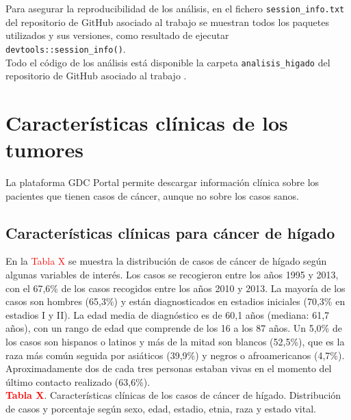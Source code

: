 Para asegurar la reproducibilidad de los análisis, en el fichero \texttt{session\_info.txt} del repositorio de GitHub asociado al trabajo \cite{Redondo-Sanchez2020} se muestran todos los paquetes utilizados y sus versiones, como resultado de ejecutar \texttt{devtools::session\_info()}.\\

Todo el código de los análisis está disponible la carpeta \texttt{analisis\_higado} del repositorio de GitHub asociado al trabajo \cite{Redondo-Sanchez2020}.

\section{Características clínicas de los tumores}
 
La plataforma GDC Portal \cite{GDCPortal} permite descargar información clínica sobre los pacientes que tienen casos de cáncer, aunque no sobre los casos sanos.

\subsection{Características clínicas para cáncer de hígado}

En la \textcolor{red}{Tabla X} se muestra  la distribución de casos de cáncer de hígado según algunas variables de interés. Los casos se recogieron entre los años 1995 y 2013, con el 67,6\% de los casos recogidos entre los años 2010 y 2013. La mayoría de los casos son hombres (65,3\%) y están diagnosticados en estadios iniciales (70,3\% en estadios I y II). La edad media de diagnóstico es de 60,1 años (mediana: 61,7 años), con un rango de edad que comprende de los 16 a los 87 años. Un 5,0\% de los casos son hispanos o latinos y más de la mitad son blancos (52,5\%), que es la raza más común seguida por asiáticos (39,9\%) y negros o afroamericanos (4,7\%). Aproximadamente dos de cada tres personas estaban vivas en el momento del último contacto realizado (63,6\%).\\

\newpage
\textbf{\textcolor{red}{Tabla X}}. Características clínicas de los casos de cáncer de hígado. Distribución de casos y porcentaje según sexo, edad, estadio, etnia, raza y estado vital.

